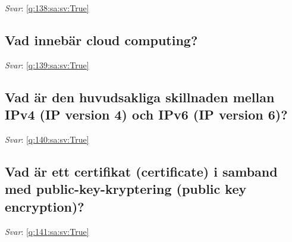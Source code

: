 \documentclass[a4paper,11pt,oneside]{article}
\begin{document}
\begin{sloppypar}
\label{q:138:sa:sv:False}

\vspace{2cm}

\noindent\makebox[\textwidth]{\hrulefill}

\vspace{1cm}

\textit{Svar}: \autoref{q:138:sa:sv:True}



\subsection{Vad inneb\"ar cloud computing?}

\label{q:139:sa:sv:False}

\vspace{2cm}

\noindent\makebox[\textwidth]{\hrulefill}

\vspace{1cm}

\textit{Svar}: \autoref{q:139:sa:sv:True}



\subsection{Vad \"ar den huvudsakliga skillnaden mellan IPv4 (IP version 4) och IPv6 (IP version 6)?}

\label{q:140:sa:sv:False}

\vspace{2cm}

\noindent\makebox[\textwidth]{\hrulefill}

\vspace{1cm}

\textit{Svar}: \autoref{q:140:sa:sv:True}



\subsection{Vad \"ar ett certifikat (certificate) i samband med public-key-kryptering (public key encryption)?}

\label{q:141:sa:sv:False}

\vspace{2cm}

\noindent\makebox[\textwidth]{\hrulefill}

\vspace{1cm}

\textit{Svar}: \autoref{q:141:sa:sv:True}




\end{sloppypar}
\end{document}
